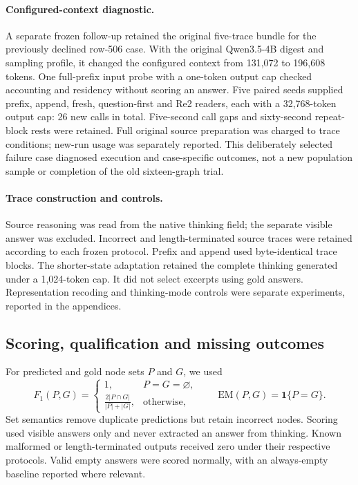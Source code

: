 \paragraph{Configured-context diagnostic.} A separate frozen follow-up retained the original five-trace bundle for the previously declined row-506 case. With the original Qwen3.5-4B digest and sampling profile, it changed the configured context from 131,072 to 196,608 tokens. One full-prefix input probe with a one-token output cap checked accounting and residency without scoring an answer. Five paired seeds supplied prefix, append, fresh, question-first and Re2 readers, each with a 32,768-token output cap: 26 new calls in total. Five-second call gaps and sixty-second repeat-block rests were retained. Full original source preparation was charged to trace conditions; new-run usage was separately reported. This deliberately selected failure case diagnosed execution and case-specific outcomes, not a new population sample or completion of the old sixteen-graph trial.


\paragraph{Trace construction and controls.} Source reasoning was read from the native thinking field; the separate visible answer was excluded. Incorrect and length-terminated source traces were retained according to each frozen protocol. Prefix and append used byte-identical trace blocks. The shorter-state adaptation retained the complete thinking generated under a 1,024-token cap. It did not select excerpts using gold answers. Representation recoding and thinking-mode controls were separate experiments, reported in the appendices.

\subsection{Scoring, qualification and missing outcomes}
For predicted and gold node sets $P$ and $G$, we used
\[
 F_1(P,G)=\begin{cases}
 1,&P=G=\varnothing,\\
 \displaystyle\frac{2|P\cap G|}{|P|+|G|},&\text{otherwise},
 \end{cases}
 \qquad \mathrm{EM}(P,G)=\mathbf{1}\{P=G\}.
\]
Set semantics remove duplicate predictions but retain incorrect nodes. Scoring used visible answers only and never extracted an answer from thinking. Known malformed or length-terminated outputs received zero under their respective protocols. Valid empty answers were scored normally, with an always-empty baseline reported where relevant.

